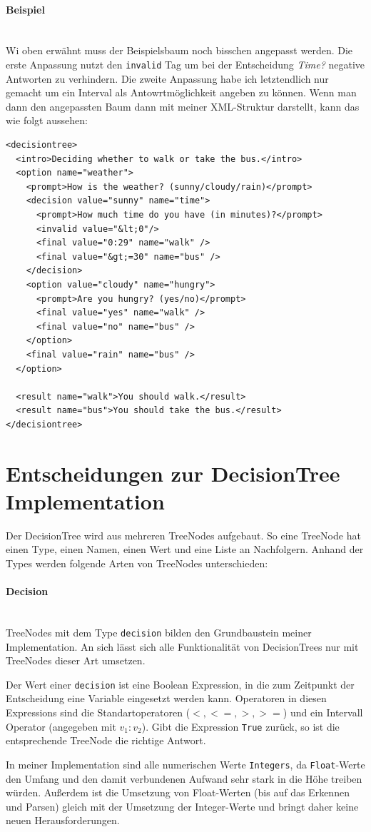 \documentclass[a4paper,12pt]{article}
\newcommand{\myparagraph}[1]{\paragraph*{#1}\mbox{}\\}
\begin{document}
\myparagraph{Beispiel}
Wi oben erwähnt muss der Beispielsbaum noch bisschen angepasst werden. 
Die erste Anpassung nutzt den \texttt{invalid} Tag um bei der Entscheidung \emph{Time?} negative Antworten zu verhindern.
Die zweite Anpassung habe ich letztendlich nur gemacht um ein Interval als Antowrtmöglichkeit angeben zu können.
Wenn man dann den angepassten Baum dann mit meiner XML-Struktur darstellt, kann das wie folgt aussehen:

\begin{verbatim}
<decisiontree>
  <intro>Deciding whether to walk or take the bus.</intro>
  <option name="weather">
    <prompt>How is the weather? (sunny/cloudy/rain)</prompt>
    <decision value="sunny" name="time">
      <prompt>How much time do you have (in minutes)?</prompt>
      <invalid value="&lt;0"/>
      <final value="0:29" name="walk" />
      <final value="&gt;=30" name="bus" />
    </decision>
    <option value="cloudy" name="hungry">
      <prompt>Are you hungry? (yes/no)</prompt>
      <final value="yes" name="walk" />
      <final value="no" name="bus" />
    </option>
    <final value="rain" name="bus" />
  </option>

  <result name="walk">You should walk.</result>
  <result name="bus">You should take the bus.</result>
</decisiontree>
\end{verbatim}

\newpage
\section*{Entscheidungen zur DecisionTree Implementation}
Der DecisionTree wird aus mehreren TreeNodes aufgebaut. So eine TreeNode hat einen Type, einen Namen, einen Wert und eine Liste an Nachfolgern. Anhand der Types werden folgende Arten von TreeNodes unterschieden:

\myparagraph{Decision}
TreeNodes mit dem Type \texttt{decision} bilden den Grundbaustein meiner Implementation. An sich lässt sich alle Funktionalität von DecisionTrees nur mit TreeNodes dieser Art umsetzen.

Der Wert einer \texttt{decision} ist eine Boolean Expression, in die zum Zeitpunkt der Entscheidung eine Variable eingesetzt werden kann. Operatoren in diesen Expressions sind die Standartoperatoren ($<, <=, >, >=$) und ein Intervall Operator (angegeben mit $v_1:v_2$). Gibt die Expression \texttt{True} zurück, so ist die entsprechende TreeNode die richtige Antwort.

In meiner Implementation sind alle numerischen Werte \texttt{Integers}, da \texttt{Float}-Werte den Umfang und den damit verbundenen Aufwand sehr stark in die Höhe treiben würden.
Außerdem ist die Umsetzung von Float-Werten (bis auf das Erkennen und Parsen) gleich mit der Umsetzung der Integer-Werte und bringt daher keine neuen Herausforderungen. 
\end{document}
